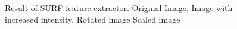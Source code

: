 \begin{figure}[H]
\begin{center}
\end{center}
\caption[Result of SURF]{Result of SURF feature extractor. Original Image, Image with increased intensity, Rotated image Scaled image} %
\end{figure}


